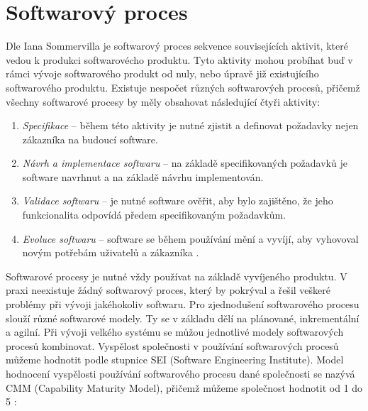 \documentclass[czech,master,public,dept460,male,cpdeclaration,oneside]{diploma}
\begin{document}
\section{Softwarový proces}
\label{sec:sw_process}

Dle Iana Sommervilla \cite{ref:sommerrville_sw_process} je softwarový proces sekvence souvisejících aktivit, které vedou k produkci softwarovécho produktu. Tyto aktivity mohou probíhat buď v rámci vývoje softwarového produkt od nuly, nebo úpravě již existujícího softwarového produktu. Existuje nespočet různých softwarových procesů, přičemž všechny softwarové procesy by měly obsahovat následující čtyři aktivity:

\begin{enumerate}
\item \textit{Specifikace} -- během této aktivity je nutné zjistit a definovat požadavky nejen zákazníka na budoucí software.
\item \textit{Návrh a implementace softwaru} -- na základě specifikovaných požadavků je software navrhnut a na základě návrhu implementován.
\item \textit{Validace softwaru }-- je nutné software ověřit, aby bylo zajištěno, že jeho funkcionalita odpovídá předem specifikovaným požadavkům.
\item \textit{Evoluce softwaru} -- software se během používání mění a vyvíjí, aby vyhovoval novým potřebám uživatelů a zákazníka .
\end{enumerate}

Softwarové procesy je nutné vždy používat na základě vyvíjeného produktu. V praxi neexistuje žádný softwarový proces, který by pokrýval a řešil veškeré problémy při vývoji jakéhokoliv softwaru. Pro zjednodušení softwarového procesu slouží různé softwarové modely. Ty se v základu dělí na plánované, inkrementální a agilní. Při vývoji velkého systému se můžou jednotlivé modely softwarových procesů kombinovat. Vyspělost společnosti v používání softwarových procesů můžeme hodnotit podle stupnice SEI (Software
Engineering Institute). Model hodnocení vyspělosti používání softwarového procesu dané společnosti se nazývá CMM (Capability Maturity Model), přičemž můžeme společnost hodnotit od 1 do 5 \cite{ref:sw_process_vondrak}:
\end{document}
